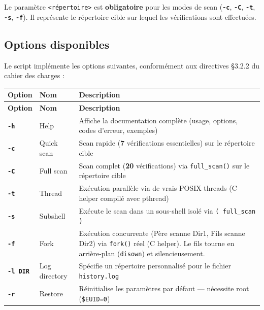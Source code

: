 \documentclass[12pt,a4paper]{article}
\newcommand{\opt}[1]{\texttt{\textcolor{bleuMed}{\textbf{#1}}}}
\newcommand{\cmd}[1]{\texttt{\textcolor{codeText}{#1}}}
\newcommand{\fichier}[1]{\texttt{\textcolor{bleuENSET}{#1}}}
\begin{document}
Le paramètre \texttt{<répertoire>} est \textbf{obligatoire} pour les modes de scan (\opt{-c}, \opt{-C}, \opt{-t}, \opt{-s}, \opt{-f}). Il représente le répertoire cible sur lequel les vérifications sont effectuées.

\subsection{Options disponibles}

Le script implémente les options suivantes, conformément aux directives §3.2.2 du cahier des charges :

\vspace{6pt}
\begin{longtable}{C{1.6cm} L{2.4cm} L{9.8cm}}
  \textbf{\color{white}Option} & \textbf{\color{white}Nom} & \textbf{\color{white}Description} \\
  \endfirsthead
  \textbf{\color{white}Option} & \textbf{\color{white}Nom} & \textbf{\color{white}Description} \\
  \endhead
  \opt{-h}       & Help            & Affiche la documentation complète (usage, options, codes d'erreur, exemples) \\
  \opt{-c}       & Quick scan      & Scan rapide (\textbf{7} vérifications essentielles) sur le répertoire cible \\
  \opt{-C}       & Full scan       & Scan complet (\textbf{20} vérifications) via \cmd{full\_scan()} sur le répertoire cible \\
  \opt{-t}       & Thread          & Exécution parallèle via de vrais POSIX threads (C helper compilé avec pthread) \\
  \opt{-s}       & Subshell        & Exécute le scan dans un sous-shell isolé via \cmd{( full\_scan )} \\
  \opt{-f}       & Fork            & Exécution concurrente (Père scanne Dir1, Fils scanne Dir2) via \cmd{fork()} réel (C helper). Le fils tourne en arrière-plan (\cmd{disown}) et silencieusement. \\
  \opt{-l DIR}   & Log directory   & Spécifie un répertoire personnalisé pour le fichier \fichier{history.log} \\
  \opt{-r}       & Restore         & Réinitialise les paramètres par défaut --- nécessite root (\cmd{\$EUID=0}) \\

\end{longtable}
\end{document}
